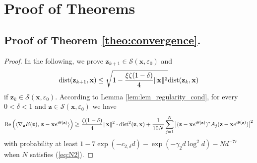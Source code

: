 \documentclass{article}
\renewcommand{\eqref}[1]{(\ref{#1})}
\newcommand{\calS}{{\mathcal S}}
\newcommand{\re}{{\rm Re}}
\newcommand{\dist}{{\rm dist}}
\newcommand{\vx}{{\mathbf x}}
\newcommand{\vz}{{\mathbf z}}
\newcommand{\0}{{\mathbf 0}}
\numberwithin{equation}{section}
\begin{document}
	\section{Proof of Theorems}\label{sec:proof_theorem}
	\subsection{Proof of Theorem \ref{theo:convergence}.}
	\label{subsec:proof-convergence}
	\begin{proof}
		In the following, we prove $\vz_{k+1} \in \calS(\vx,\varepsilon_0)$  and $$\dist(\vz_{k+1},\vx)\le\sqrt{1-\frac{\xi\zeta(1-\delta)}{4}\|\vx\|^2}\dist(\vz_k,\vx)$$
		if $\vz_k \in \calS(\vx,\varepsilon_0)$. According to Lemma \ref{lem:lem_regularity_cond}, for every $0<\delta<1$ and $\vz\in\calS(\vx,\varepsilon_0)$ we have  
		\begin{equation}\label{curvature_condition}
			\re\left(\langle\nabla_{\vz} E(\vz),\,\vz-\vx e^{i\theta(\vz)}\rangle\right)\ge \frac{\zeta(1-\delta)}{4}\|\vx\|^2\cdot\dist^2(\vz,\vx)+\frac{1}{10N}\sum_{j=1}^{N}\big|(\vz-\vx e^{i\theta(\vz)})^*A_j(\vz-\vx e^{i\theta(\vz)})\big|^2
		\end{equation}
		with probability at least $ 1-7\exp(- c_{2,\delta} d)-\exp(-\gamma_2 d\log^2d)-Nd^{-7r}$ when $ N $ satisfies \eqref{eq:N2}.
		

\end{proof}
\end{document}
